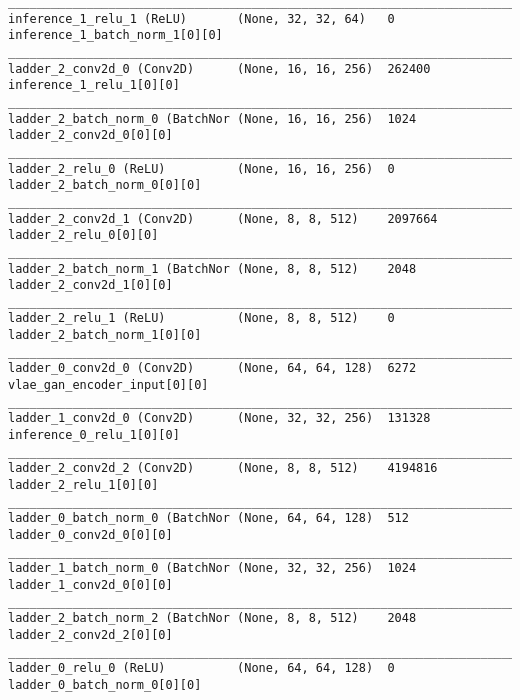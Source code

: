 \begin{lstlisting}[caption={CelebA-\ac{VLAE}-\ac{GAN} Encoder},captionpos=b,basicstyle=\tiny, label={lst:mnist-vlae-gan-encoder}]
__________________________________________________________________________________________________
inference_1_relu_1 (ReLU)       (None, 32, 32, 64)   0           inference_1_batch_norm_1[0][0]
__________________________________________________________________________________________________
ladder_2_conv2d_0 (Conv2D)      (None, 16, 16, 256)  262400      inference_1_relu_1[0][0]
__________________________________________________________________________________________________
ladder_2_batch_norm_0 (BatchNor (None, 16, 16, 256)  1024        ladder_2_conv2d_0[0][0]
__________________________________________________________________________________________________
ladder_2_relu_0 (ReLU)          (None, 16, 16, 256)  0           ladder_2_batch_norm_0[0][0]
__________________________________________________________________________________________________
ladder_2_conv2d_1 (Conv2D)      (None, 8, 8, 512)    2097664     ladder_2_relu_0[0][0]
__________________________________________________________________________________________________
ladder_2_batch_norm_1 (BatchNor (None, 8, 8, 512)    2048        ladder_2_conv2d_1[0][0]
__________________________________________________________________________________________________
ladder_2_relu_1 (ReLU)          (None, 8, 8, 512)    0           ladder_2_batch_norm_1[0][0]
__________________________________________________________________________________________________
ladder_0_conv2d_0 (Conv2D)      (None, 64, 64, 128)  6272        vlae_gan_encoder_input[0][0]
__________________________________________________________________________________________________
ladder_1_conv2d_0 (Conv2D)      (None, 32, 32, 256)  131328      inference_0_relu_1[0][0]
__________________________________________________________________________________________________
ladder_2_conv2d_2 (Conv2D)      (None, 8, 8, 512)    4194816     ladder_2_relu_1[0][0]
__________________________________________________________________________________________________
ladder_0_batch_norm_0 (BatchNor (None, 64, 64, 128)  512         ladder_0_conv2d_0[0][0]
__________________________________________________________________________________________________
ladder_1_batch_norm_0 (BatchNor (None, 32, 32, 256)  1024        ladder_1_conv2d_0[0][0]
__________________________________________________________________________________________________
ladder_2_batch_norm_2 (BatchNor (None, 8, 8, 512)    2048        ladder_2_conv2d_2[0][0]
__________________________________________________________________________________________________
ladder_0_relu_0 (ReLU)          (None, 64, 64, 128)  0           ladder_0_batch_norm_0[0][0]

\end{lstlisting}
